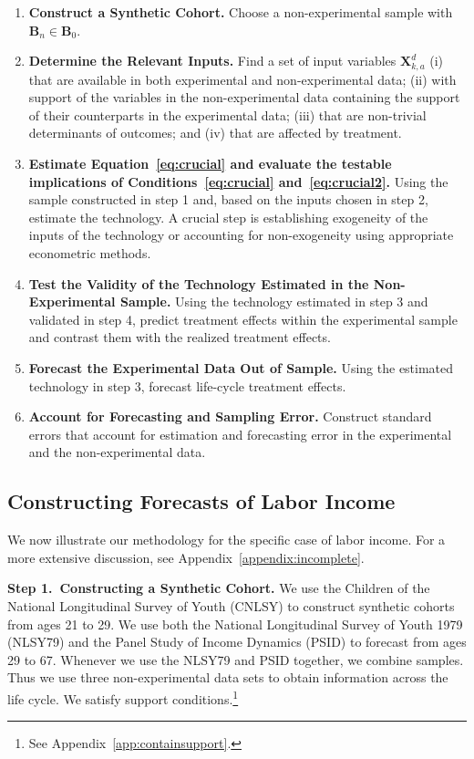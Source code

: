 \begin{enumerate}
\item \textbf{Construct a Synthetic Cohort.} Choose a non-experimental sample with $\bm{B}_n \in \bm{B}_0$.
\item \textbf{Determine the Relevant Inputs.} Find a set of input variables $\bm{X}^d_{k,a}$ (i) that are available in both experimental and non-experimental data; (ii) with support of the variables in the non-experimental data containing the support of their counterparts in the experimental data; (iii) that are non-trivial determinants of outcomes; and (iv) that are affected by treatment.
\item \textbf{Estimate Equation~\eqref{eq:crucial} and evaluate the testable implications of Conditions~\eqref{eq:crucial} and~\eqref{eq:crucial2}.} Using the sample constructed in step 1 and, based on the inputs chosen in step 2, estimate the technology. A crucial step is establishing exogeneity of the inputs of the technology or accounting for non-exogeneity using appropriate econometric methods.
\item \textbf{Test the Validity of the Technology Estimated in the Non-Experimental Sample.} Using the technology estimated in step 3 and validated in step 4, predict treatment effects within the experimental sample and contrast them with the realized treatment effects.
\item \textbf{Forecast the Experimental Data Out of Sample.} Using the estimated technology in step 3, forecast life-cycle treatment effects.
\item \textbf{Account for Forecasting and Sampling Error.} Construct standard errors that account for estimation and forecasting error in the experimental and the non-experimental data.
\end{enumerate}

\subsection{Constructing Forecasts of Labor Income}

We now illustrate our methodology for the specific case of labor income. For a more extensive discussion, see Appendix~\ref{appendix:incomplete}.

\textbf{Step 1.\ Constructing a Synthetic Cohort.} We use the Children of the National Longitudinal Survey of Youth (CNLSY) to construct synthetic cohorts from ages 21 to 29. We use both the National Longitudinal Survey of Youth 1979 (NLSY79) and the Panel Study of Income Dynamics (PSID) to forecast from ages 29 to 67. Whenever we use the NLSY79 and PSID together, we combine samples. Thus we use three non-experimental data sets to obtain information across the life cycle. We satisfy support conditions.\footnote{See Appendix~\ref{app:containsupport}.}

